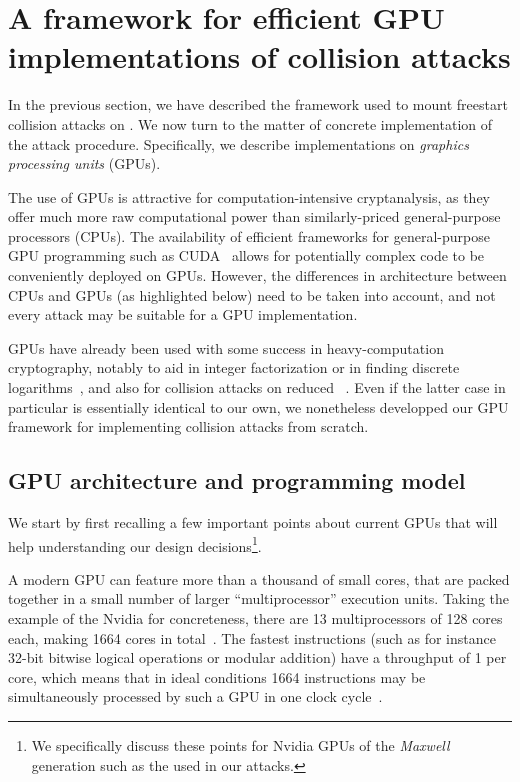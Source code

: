 \section{A framework for efficient GPU implementations of collision attacks}

In the previous section, we have described the framework used to mount freestart collision attacks on \shaone. We now turn to
the matter of concrete implementation of the attack procedure. Specifically, we describe implementations on \emph{graphics processing
units} (GPUs).

The use of GPUs is attractive for computation-intensive cryptanalysis, as they offer much more raw computational power than
similarly-priced general-purpose processors (\ie CPUs). The availability of efficient frameworks for general-purpose GPU programming such as CUDA~\cite{cuda} allows
for potentially complex code to be conveniently deployed on GPUs. However, the differences in architecture between CPUs and GPUs
(as highlighted below) need to be taken into account, and not every attack may be suitable for a GPU implementation.

GPUs have already been used with some success in heavy-computation cryptography, notably to aid in integer factorization or in finding discrete
logarithms~\cite{DBLP:conf/asiacrypt/BosK12,DBLP:conf/ches/MieleBKL14,DBLP:conf/eurocrypt/BarbulescuGGM15,DBLP:phd/hal/Jeljeli15}, and also for collision attacks on reduced \shaone~\cite{cryptoeprint:2011:641}.
Even if the latter case in particular is essentially identical to our own, we nonetheless developped our GPU framework for implementing collision attacks from scratch.

\subsection{GPU architecture and programming model}

We start by first recalling a few important points about current GPUs that will help
understanding our design decisions\footnote{We specifically discuss these points
for Nvidia GPUs of the \emph{Maxwell} generation such as the \gtx
used in our attacks.}.

A modern GPU can feature more
than a thousand of small cores, that are packed together in a small
number of larger ``multiprocessor'' execution units. Taking the example of the
Nvidia \gtx for concreteness, there are 13 multiprocessors of 128 cores each,
making 1664 cores in total~\cite{gtx970_specs}. The fastest instructions
(such as for instance 32-bit bitwise logical operations or modular addition) have a throughput of 1 per core,
which means that in ideal conditions 1664 instructions may be simultaneously processed by such a GPU in one clock
cycle~\cite{cuda_prog_guide}.


